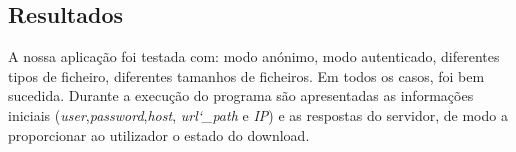 \subsection*{Resultados}
A nossa aplicação foi testada com: modo anónimo, modo autenticado, diferentes tipos de ficheiro, diferentes tamanhos de ficheiros. Em todos os casos, foi bem sucedida.
Durante a execução do programa são apresentadas as informações iniciais (\textit{user},\textit{password},\textit{host}, \textit{url\char`_path} e \textit{IP}) e as respostas do servidor, de modo a proporcionar ao utilizador o estado do download. 